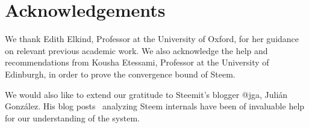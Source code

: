 \section{Acknowledgements}
  We thank Edith Elkind, Professor at the University of Oxford, for her guidance on relevant previous academic work.
  We also acknowledge the help and recommendations from Kousha Etessami, Professor at the University of Edinburgh, in order to prove the convergence bound of Steem.

  We would also like to extend our gratitude to Steemit's blogger @jga, Juli\'an Gonz\'alez. His blog posts~\cite{curationRewards,selfvoters} analyzing Steem internals have been of invaluable help for our understanding of the system.

